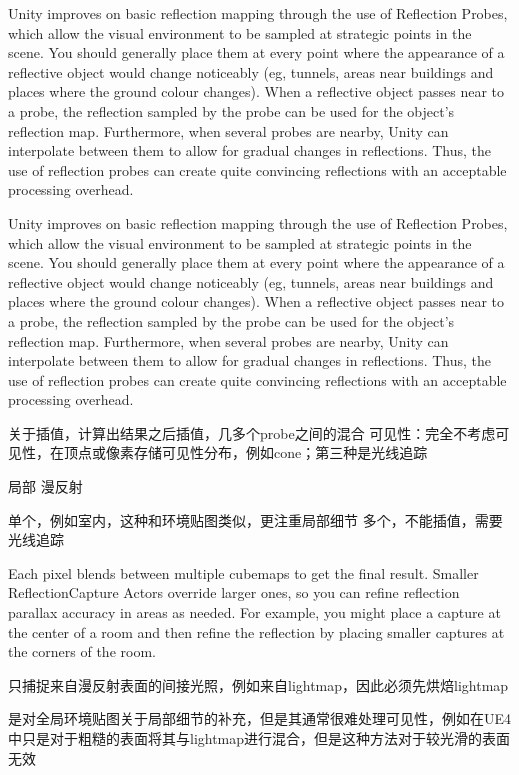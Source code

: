 Unity improves on basic reflection mapping through the use of Reflection Probes, which allow the visual environment to be sampled at strategic points in the scene. You should generally place them at every point where the appearance of a reflective object would change noticeably (eg, tunnels, areas near buildings and places where the ground colour changes). When a reflective object passes near to a probe, the reflection sampled by the probe can be used for the object’s reflection map. Furthermore, when several probes are nearby, Unity can interpolate between them to allow for gradual changes in reflections. Thus, the use of reflection probes can create quite convincing reflections with an acceptable processing overhead.

Unity improves on basic reflection mapping through the use of Reflection Probes, which allow the visual environment to be sampled at strategic points in the scene. You should generally place them at every point where the appearance of a reflective object would change noticeably (eg, tunnels, areas near buildings and places where the ground colour changes). When a reflective object passes near to a probe, the reflection sampled by the probe can be used for the object’s reflection map. Furthermore, when several probes are nearby, Unity can interpolate between them to allow for gradual changes in reflections. Thus, the use of reflection probes can create quite convincing reflections with an acceptable processing overhead.




关于插值，计算出结果之后插值，几多个probe之间的混合
可见性：完全不考虑可见性，在顶点或像素存储可见性分布，例如cone；第三种是光线追踪





局部
漫反射



单个，例如室内，这种和环境贴图类似，更注重局部细节
多个，不能插值，需要光线追踪



Each pixel blends between multiple cubemaps to get the final result. Smaller ReflectionCapture Actors override larger ones, so you can refine reflection parallax accuracy in areas as needed. For example, you might place a capture at the center of a room and then refine the reflection by placing smaller captures at the corners of the room.

只捕捉来自漫反射表面的间接光照，例如来自lightmap，因此必须先烘焙lightmap

是对全局环境贴图关于局部细节的补充，但是其通常很难处理可见性，例如在UE4中只是对于粗糙的表面将其与lightmap进行混合，但是这种方法对于较光滑的表面无效





